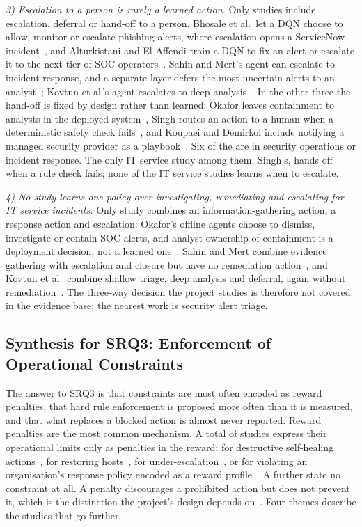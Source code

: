 \emph{3) Escalation to a person is rarely a learned action.} Only \NEsc{} studies include escalation, deferral or hand-off to a person. Bhosale et al.\ let a DQN choose to allow, monitor or escalate phishing alerts, where escalation opens a ServiceNow incident~\cite{bhosale2026}, and Alturkistani and El-Affendi train a DQN to fix an alert or escalate it to the next tier of SOC operators~\cite{alturkistani2022}. Sahin and Mert's agent can escalate to incident response, and a separate layer defers the most uncertain alerts to an analyst~\cite{sahin2026}; Kovtun et al.'s agent escalates to deep analysis~\cite{kovtun2026}. In the other three the hand-off is fixed by design rather than learned: Okafor leaves containment to analysts in the deployed system~\cite{okafor2026}, Singh routes an action to a human when a deterministic safety check fails~\cite{singh2026}, and Koupaei and Demirkol include notifying a managed security provider as a playbook~\cite{koupaei2026}. Six of the \NEsc{} are in security operations or incident response. The only IT service study among them, Singh's, hands off when a rule check fails; none of the \NSetITOPS{} IT service studies learns when to escalate.

\emph{4) No study learns one policy over investigating, remediating and escalating for IT service incidents.} Only \NAllThree{} study combines an information-gathering action, a response action and escalation: Okafor's offline agents choose to dismiss, investigate or contain SOC alerts, and analyst ownership of containment is a deployment decision, not a learned one~\cite{okafor2026}. Sahin and Mert combine evidence gathering with escalation and closure but have no remediation action~\cite{sahin2026}, and Kovtun et al.\ combine shallow triage, deep analysis and deferral, again without remediation~\cite{kovtun2026}. The three-way decision the project studies is therefore not covered in the evidence base; the nearest work is security alert triage.

\subsection{Synthesis for SRQ3: Enforcement of Operational Constraints}

The answer to SRQ3 is that constraints are most often encoded as reward penalties, that hard rule enforcement is proposed more often than it is measured, and that what replaces a blocked action is almost never reported. Reward penalties are the most common mechanism. A total of \NPenalty{} studies express their operational limits only as penalties in the reward: for destructive self-healing actions~\cite{yuan2026}, for restoring hosts~\cite{nyberg2024,hammar2026belief,hammar2025}, for under-escalation~\cite{bhosale2026}, or for violating an organisation's response policy encoded as a reward profile~\cite{hughes2022}. A further \NNoCon{} state no constraint at all. A penalty discourages a prohibited action but does not prevent it, which is the distinction the project's design depends on~\cite{konighofer2025}. Four themes describe the studies that go further.

